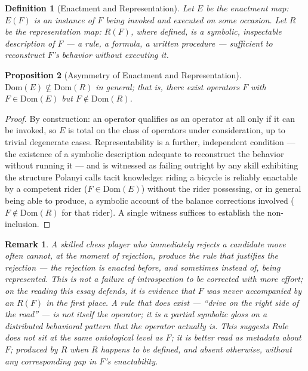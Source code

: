 \documentclass[11pt]{article}
\newtheorem{definition}{Definition}[section]
\newtheorem{proposition}[definition]{Proposition}
\newtheorem*{remark}{Remark}
\begin{document}
\begin{definition}[Enactment and Representation]
Let $E$ be the enactment map: $E(F)$ is an instance of $F$ being invoked and executed on some occasion. Let $R$ be the representation map: $R(F)$, where defined, is a symbolic, inspectable description of $F$ — a rule, a formula, a written procedure — sufficient to reconstruct $F$'s behavior without executing it.
\end{definition}

\begin{proposition}[Asymmetry of Enactment and Representation]
$\mathrm{Dom}(E) \not\subseteq \mathrm{Dom}(R)$ in general; that is, there exist operators $F$ with $F\in\mathrm{Dom}(E)$ but $F\notin\mathrm{Dom}(R)$.
\end{proposition}

\begin{proof}
By construction: an operator qualifies as an operator at all only if it can be invoked, so $E$ is total on the class of operators under consideration, up to trivial degenerate cases. Representability is a further, independent condition — the existence of a symbolic description adequate to reconstruct the behavior without running it — and is witnessed as failing outright by any skill exhibiting the structure Polanyi calls tacit knowledge: riding a bicycle is reliably enactable by a competent rider ($F\in\mathrm{Dom}(E)$) without the rider possessing, or in general being able to produce, a symbolic account of the balance corrections involved ($F\notin\mathrm{Dom}(R)$ for that rider). A single witness suffices to establish the non-inclusion.
\end{proof}

\begin{remark}
A skilled chess player who immediately rejects a candidate move often cannot, at the moment of rejection, produce the rule that justifies the rejection — the rejection is enacted before, and sometimes instead of, being represented. This is not a failure of introspection to be corrected with more effort; on the reading this essay defends, it is evidence that $F$ was never accompanied by an $R(F)$ in the first place. A rule that \emph{does} exist — ``drive on the right side of the road'' — is not itself the operator; it is a partial symbolic gloss on a distributed behavioral pattern that the operator actually is. This suggests Rule does not sit at the same ontological level as $F$; it is better read as metadata about $F$; produced by $R$ when $R$ happens to be defined, and absent otherwise, without any corresponding gap in $F$'s enactability.
\end{remark}
\end{document}
